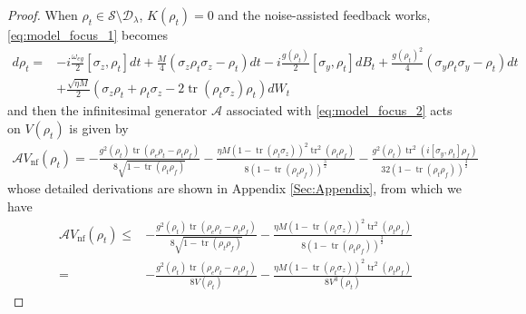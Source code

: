 \documentclass[]{elsarticle}
\begin{document}
\begin{proof}
	When $\rho_t\in \mathcal{S}\setminus \mathcal{D}_\lambda$, $K\left(\rho_t\right)=0$ and the noise-assisted feedback works, \eqref{eq:model_focus_1} becomes
	\begin{equation}\label{eq:model_focus_2}
		\begin{aligned}
			d \rho_t=&-{{i}}\frac{\omega_{eg}}{2}\left[\sigma_z, \rho_{t}\right]dt+\frac{M}{4}\left(\sigma_z \rho_t \sigma_z-\rho_t\right) d t-{{i}}\frac{g\left(\rho_t\right)}{2}\left[\sigma_y, \rho_t\right] d B_t+\frac{g\left(\rho_t\right)^{2}}{4}\left(\sigma_y \rho_t \sigma_y-\rho_t\right) d t\\
			&+\frac{\sqrt{\eta M}}{2} \left(\sigma_z \rho_t+\rho_t \sigma_z-2 \operatorname{tr}\left(\rho_t \sigma_z\right) \rho_t\right) d W_t
		\end{aligned}
	\end{equation}
	and then the infinitesimal generator $\mathcal{A}$ associated with \eqref{eq:model_focus_2} acts on $V(\rho_{t})$ is given by
	\begin{equation}\label{eq:LV_cf}
		\begin{aligned}
			\mathcal{A}V_{\mathrm{nf}}\left(\rho_{t}\right)
			=-\frac{g^{2}(\rho_{t})\operatorname{tr}\left(\rho_{e}\rho_{t}-\rho_t\rho_{f}\right)}{8\sqrt{1-\operatorname{tr}\left(\rho_t \rho_{f}\right)}}
			-\frac{\eta M (1-\operatorname{tr}(\rho_{t}\sigma_z))^{2}\operatorname{tr}^{2}\left(\rho_t \rho_{f}\right)}{8\left(1-\operatorname{tr}\left(\rho_t \rho_{f}\right)\right)^{\frac{3}{2}}}
			-\frac{g^{2}\left(\rho_t\right)\operatorname{tr}^2\left(i\left[\sigma_y, \rho_t\right]\rho_{f}\right)}{32\left(1-\operatorname{tr}\left(\rho_t \rho_{f}\right)\right)^{\frac{3}{2}}}
		\end{aligned}
	\end{equation}
	whose detailed derivations are shown in Appendix \ref{Sec:Appendix}, from which we have
	\begin{equation}\label{eq:LV_cf_1}
		\begin{aligned}
			\mathcal{A}V_{\mathrm{nf}}\left(\rho_{t}\right)
			\le&-\frac{g^{2}(\rho_{t})\operatorname{tr}\left(\rho_{e}\rho_{t}-\rho_t\rho_{f}\right)}{8\sqrt{1-\operatorname{tr}\left(\rho_t \rho_{f}\right)}}-\frac{\eta M (1-\operatorname{tr}(\rho_{t}\sigma_z))^{2}\operatorname{tr}^{2}\left(\rho_t \rho_{f}\right)}{8\left(1-\operatorname{tr}\left(\rho_t \rho_{f}\right)\right)^{\frac{3}{2}}}\\
			=&-\frac{g^{2}(\rho_{t})\operatorname{tr}\left(\rho_{e}\rho_{t}-\rho_t\rho_{f}\right)}{8V\left(\rho_{t}\right)}-\frac{\eta M (1-\operatorname{tr}(\rho_{t}\sigma_z))^{2}\operatorname{tr}^{2}\left(\rho_t \rho_{f}\right)}{8V^3\left(\rho_{t}\right)}

\end{aligned}
\end{equation}
\end{proof}
\end{document}

